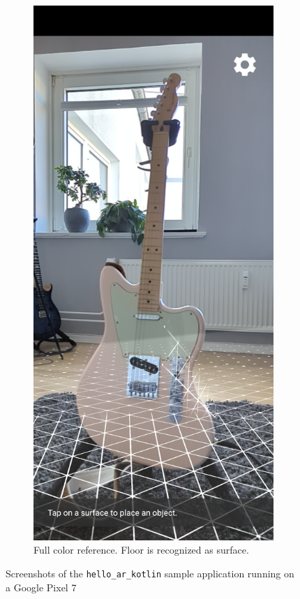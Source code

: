 \begin{figure}[ht!]
\begin{subfigure}[t]{.45\textwidth}
        \includegraphics[width=.8\textwidth]{images/depth_api_hello_world_img}
        \caption{Full color reference. Floor is recognized as surface.}
    \end{subfigure}
    \caption{Screenshots of the \texttt{hello\_ar\_kotlin} sample application running on a Google Pixel 7}
    \label{fig:hello_world_screenshot}
\end{figure}
